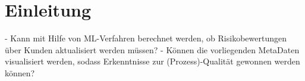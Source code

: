 \chapter{Einleitung}\label{ch:intro}





- Kann mit Hilfe von ML-Verfahren berechnet werden, ob Risikobewertungen über Kunden aktualisiert werden müssen? 
- Können die vorliegenden MetaDaten visualisiert werden, sodass Erkenntnisse zur (Prozess)-Qualität gewonnen werden können? 

\cite{d.kelleher2015a}
\cite{d.kelleher2015}





